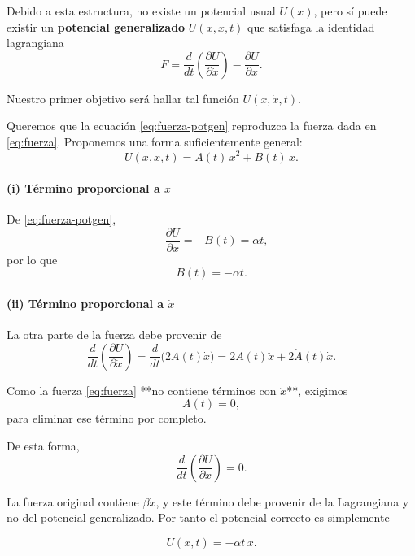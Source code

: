 \documentclass{article}
\begin{document}
Debido a esta estructura, no existe un potencial usual $U(x)$, pero sí puede existir un  
\textbf{potencial generalizado} $U(x,\dot x,t)$ que satisfaga la identidad lagrangiana
\begin{equation}
F
= \frac{d}{dt}\left(\frac{\partial U}{\partial \dot x}\right)
  - \frac{\partial U}{\partial x}.
\label{eq:fuerza-potgen}
\end{equation}

Nuestro primer objetivo será hallar tal función $U(x,\dot x,t)$.



Queremos que la ecuación \eqref{eq:fuerza-potgen} reproduzca la fuerza dada en \eqref{eq:fuerza}.  
Proponemos una forma suficientemente general:
\begin{equation}
U(x,\dot x,t) = A(t)\,\dot x^{2} + B(t)\,x.
\label{eq:U-general}
\end{equation}

\paragraph{(i) Término proporcional a $x$}

De \eqref{eq:fuerza-potgen},
\[
-\,\frac{\partial U}{\partial x} = -B(t) = \alpha t,
\]
por lo que
\begin{equation}
B(t) = -\alpha t.
\label{eq:B}
\end{equation}

\paragraph{(ii) Término proporcional a $\dot x$}

La otra parte de la fuerza debe provenir de
\[
\frac{d}{dt}\left(\frac{\partial U}{\partial\dot x}\right)
= \frac{d}{dt}\bigl( 2A(t)\dot x \bigr)
= 2A(t)\ddot x + 2\dot A(t)\dot x.
\]

Como la fuerza \eqref{eq:fuerza} **no contiene términos con $\ddot x$**, exigimos
\[
A(t)=0,
\]
para eliminar ese término por completo.

De esta forma,
\[
\frac{d}{dt}\left(\frac{\partial U}{\partial\dot x}\right)
= 0.
\]

La fuerza original contiene $\beta\dot x$, y este término debe provenir de la Lagrangiana y no del potencial generalizado.  
Por tanto el potencial correcto es simplemente

\begin{equation}
U(x,t) = -\alpha t\,x.
\label{eq:U-final}
\end{equation}
\end{document}
